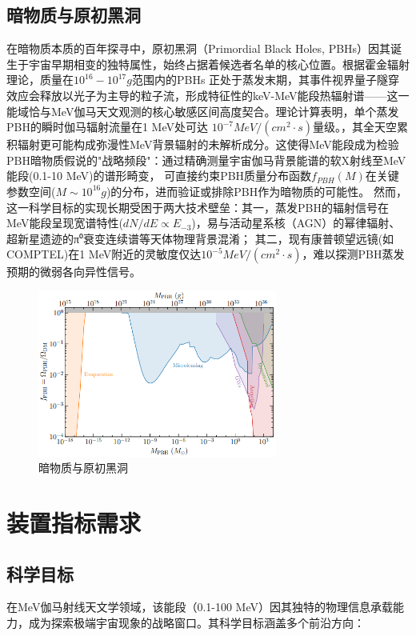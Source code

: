\subsection{暗物质与原初黑洞}
\label{subsec:darkmatter}
在暗物质本质的百年探寻中，原初黑洞（Primordial Black Holes, PBHs）因其诞生于宇宙早期相变的独特属性，始终占据着候选者名单的核心位置。根据霍金辐射理论，质量在$10^{16}-10^{17}g$范围内的PBHs
正处于蒸发末期，其事件视界量子隧穿效应会释放以光子为主导的粒子流，形成特征性的keV-MeV能段热辐射谱——这一能域恰与MeV伽马天文观测的核心敏感区间高度契合。理论计算表明，单个蒸发PBH的瞬时伽马辐射流量在1 MeV处可达
$10^{-7}MeV/(cm^2 \cdot s)$量级。，其全天空累积辐射更可能构成弥漫性MeV背景辐射的未解析成分。这使得MeV能段成为检验PBH暗物质假说的"战略频段"：通过精确测量宇宙伽马背景能谱的软X射线至MeV能段(0.1-10 MeV)的谱形畸变，
可直接约束PBH质量分布函数$f_{PBH}(M)$在关键参数空间($M \sim 10^{16} g$)的分布，进而验证或排除PBH作为暗物质的可能性。
然而，这一科学目标的实现长期受困于两大技术壁垒：其一，蒸发PBH的辐射信号在MeV能段呈现宽谱特性($dN/dE \propto E_{-3} $)，易与活动星系核（AGN）的幂律辐射、超新星遗迹的π⁰衰变连续谱等天体物理背景混淆；
其二，现有康普顿望远镜(如COMPTEL)在1 MeV附近的灵敏度仅达$10^{-5} MeV/(cm^2 \cdot s)$，难以探测PBH蒸发预期的微弱各向异性信号。
\begin{figure}[H]
	\centering
	\includegraphics[width=0.7\textwidth]{figures/暗物质与原初黑洞.png}
	\caption{暗物质与原初黑洞} \label{fig:darkmatter}
\end{figure}

\section{装置指标需求}

\subsection{科学目标}
在MeV伽马射线天文学领域，该能段（0.1-100 MeV）因其独特的物理信息承载能力，成为探索极端宇宙现象的战略窗口。其科学目标涵盖多个前沿方向：

